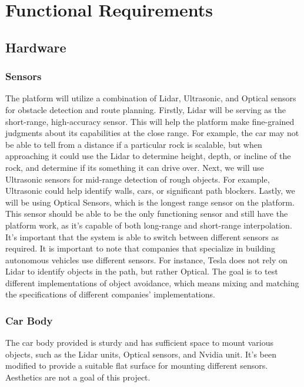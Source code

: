 \documentclass[onecolumn, draftclsnofoot,10pt]{IEEEtran}
\begin{document}
\section{Functional Requirements}

\bigskip

\subsection{Hardware}

\bigskip

\subsubsection{Sensors}
    The platform will utilize a combination of Lidar, Ultrasonic, and Optical sensors for obstacle detection and route planning. Firstly, Lidar will be serving as the short-range, high-accuracy sensor. This will help the platform make fine-grained judgments about its capabilities at the close range. For example, the car may not be able to tell from a distance if a particular rock is scalable, but when approaching it could use the Lidar to determine height, depth, or incline of the rock, and determine if its something it can drive over. Next, we will use Ultrasonic sensors for mid-range detection of rough objects. For example, Ultrasonic could help identify walls, cars, or significant path blockers.  Lastly, we will be using Optical Sensors, which is the longest range sensor on the platform. This sensor should be able to be the only functioning sensor and still have the platform work, as it’s capable of both long-range and short-range interpolation. It’s important that the system is able to switch between different sensors as required. It is important to note that companies that specialize in building autonomous vehicles use different sensors. For instance, Tesla does not rely on  Lidar to identify objects in the path, but rather Optical. The goal is to test different implementations of object avoidance, which means mixing and matching the specifications of different companies' implementations. 

\subsubsection{Car Body}
    The car body provided is sturdy and has sufficient space to mount various objects, such as the Lidar units, Optical sensors, and Nvidia unit. It's been modified to provide a suitable flat surface for mounting different sensors. Aesthetics are not a goal of this project.
    
\end{document}
